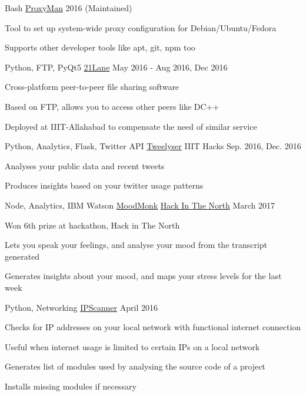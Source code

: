 \cvproject
\begin{cventries}
  \cventry
    {Bash}
    {\href{https://github.com/himanshub16/ProxyMan/}{ProxyMan}}
    {}
    {2016 (Maintained)}
    {
      \begin{cvitems}
        \item {Tool to set up system-wide proxy configuration for Debian/Ubuntu/Fedora}
        \item {Supports other developer tools like apt, git, npm too}
      \end{cvitems}
    }
  \cventry
    {Python, FTP, PyQt5}
    {\href{https://github.com/himanshub16/21Lane/}{21Lane}}
    {}
    {May 2016 - Aug 2016, Dec 2016}
    {
      \begin{cvitems}
        \item {Cross-platform peer-to-peer file sharing software}
        \item {Based on FTP, allows you to access other peers like DC++}
        \item {Deployed at IIIT-Allahabad to compensate the need of similar service}
      \end{cvitems}
    }
  \cventry
    {Python, Analytics, Flask, Twitter API}
    {\href{https://bit.ly/tweelyser}{Tweelyser}}
    {IIIT Hacks}
    {Sep. 2016, Dec. 2016}
    {
      \begin{cvitems}
        \item {Analyses your public data and recent tweets}
        \item {Produces insights based on your twitter usage patterns}
      \end{cvitems} 
    }
  \cventry
    {Node, Analytics, IBM Watson}
    {\href{https://github.com/himanshub16/moodmonk}{MoodMonk}}
    {\href{https://www.hackinthenorth.com}{Hack In The North}}
    {March 2017}
    {
      \begin{cvitems}
        \item {Won 6th prize at hackathon, Hack in The North}
        \item {Lets you speak your feelings, and analyse your mood from the transcript generated}
        \item {Generates insights about your mood, and maps your stress levels for the last week}
      \end{cvitems}
    }
  \cventry
    {Python, Networking}
    {\href{https://github.com/himanshub16/IPScanner}{IPScanner}}
    {}
    {April 2016}
    {
      \begin{cvitems}
        \item {Checks for IP addresses on your local network with functional internet connection}
        \item {Useful when internet usage is limited to certain IPs on a local network}
      \end{cvitems}
    }
  \cventry
    
    {
      \begin{cvitems}
        \item {Generates list of modules used by analysing the source code of a project}
        \item {Installs missing modules if necessary}
      \end{cvitems}
    }
\end{cventries}
